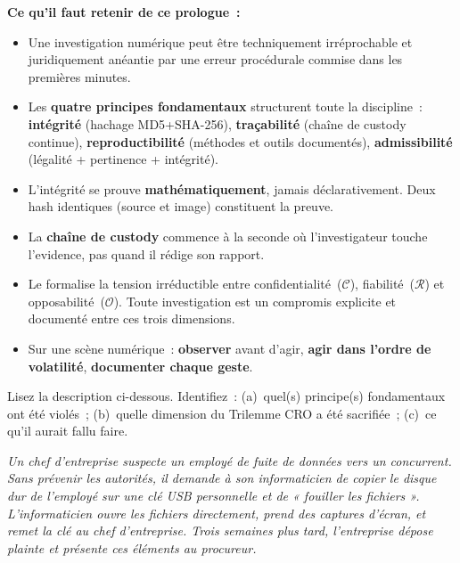 \begin{boxresume}
\textbf{Ce qu'il faut retenir de ce prologue~:}

\begin{itemize}
    \item Une investigation numérique peut être techniquement irréprochable
          et juridiquement anéantie par une erreur procédurale commise dans
          les premières minutes.

    \item Les \textbf{quatre principes fondamentaux} structurent toute la
          discipline~: \textbf{intégrité} (hachage MD5+SHA-256),
          \textbf{traçabilité} (chaîne de custody continue),
          \textbf{reproductibilité} (méthodes et outils documentés),
          \textbf{admissibilité} (légalité + pertinence + intégrité).

    \item L'intégrité se prouve \textbf{mathématiquement}, jamais
          déclarativement. Deux hash identiques (source et image) constituent
          la preuve.

    \item La \textbf{chaîne de custody} commence à la seconde où
          l'investigateur touche l'evidence, pas quand il rédige son rapport.

    \item Le  formalise la tension irréductible entre
          confidentialité~($\mathcal{C}$), fiabilité~($\mathcal{R}$)
          et opposabilité~($\mathcal{O}$). Toute investigation est un
          compromis explicite et documenté entre ces trois dimensions.

    \item Sur une scène numérique~: \textbf{observer} avant d'agir,
          \textbf{agir dans l'ordre de volatilité}, \textbf{documenter
          chaque geste}.
\end{itemize}
\end{boxresume}

\bigskip

\begin{boxexo}[title={\ding{45}\quad Exercice P.1. Diagnostic d'une violation \niveaubase}]
Lisez la description ci-dessous. Identifiez~: (a)~quel(s) principe(s)
fondamentaux ont été violés~; (b)~quelle dimension du Trilemme CRO a été
sacrifiée~; (c)~ce qu'il aurait fallu faire.

\medskip
\textit{Un chef d'entreprise suspecte un employé de fuite de données
vers un concurrent. Sans prévenir les autorités, il demande à son
informaticien de copier le disque dur de l'employé sur une clé USB
personnelle et de « fouiller les fichiers ». L'informaticien ouvre
les fichiers directement, prend des captures d'écran, et remet la
clé au chef d'entreprise. Trois semaines plus tard, l'entreprise
dépose plainte et présente ces éléments au procureur.}
\end{boxexo}

